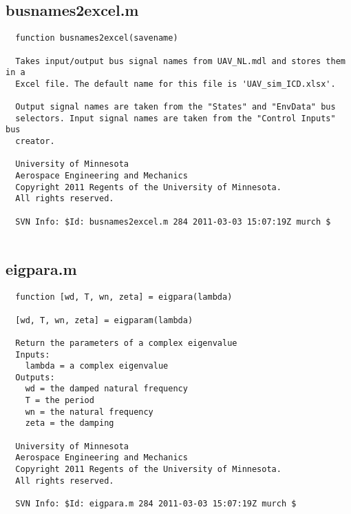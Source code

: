 \documentclass[12pt]{article}
\begin{document}
\subsection{busnames2excel.m}
\begin{verbatim}
  function busnames2excel(savename)
 
  Takes input/output bus signal names from UAV_NL.mdl and stores them in a
  Excel file. The default name for this file is 'UAV_sim_ICD.xlsx'.
 
  Output signal names are taken from the "States" and "EnvData" bus
  selectors. Input signal names are taken from the "Control Inputs" bus
  creator.
 
  University of Minnesota 
  Aerospace Engineering and Mechanics 
  Copyright 2011 Regents of the University of Minnesota. 
  All rights reserved.
 
  SVN Info: $Id: busnames2excel.m 284 2011-03-03 15:07:19Z murch $


\end{verbatim}

\subsection{eigpara.m}
\begin{verbatim}
  function [wd, T, wn, zeta] = eigpara(lambda)
 
  [wd, T, wn, zeta] = eigparam(lambda)
 
  Return the parameters of a complex eigenvalue
  Inputs:
    lambda = a complex eigenvalue
  Outputs:
    wd = the damped natural frequency
    T = the period
    wn = the natural frequency
    zeta = the damping
 
  University of Minnesota 
  Aerospace Engineering and Mechanics 
  Copyright 2011 Regents of the University of Minnesota. 
  All rights reserved.
 
  SVN Info: $Id: eigpara.m 284 2011-03-03 15:07:19Z murch $


\end{verbatim}
\end{document}
